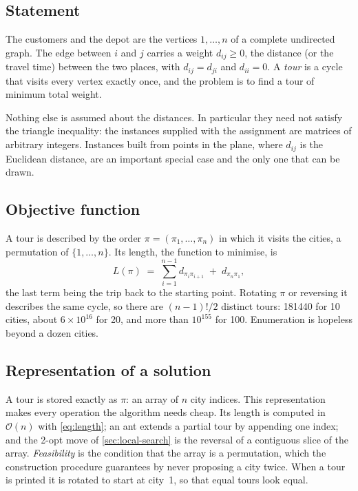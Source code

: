 \documentclass[11pt,a4paper]{article}
\newcommand{\bigO}{\mathcal{O}}
\begin{document}
\subsection{Statement}

The customers and the depot are the vertices $1,\dots,n$ of a complete undirected graph.
The edge between $i$ and $j$ carries a weight $d_{ij}\ge 0$, the distance (or the travel
time) between the two places, with $d_{ij}=d_{ji}$ and $d_{ii}=0$. A \emph{tour} is a cycle
that visits every vertex exactly once, and the problem is to find a tour of minimum total
weight.

Nothing else is assumed about the distances. In particular they need not satisfy the
triangle inequality: the instances supplied with the assignment are matrices of arbitrary
integers. Instances built from points in the plane, where $d_{ij}$ is the Euclidean
distance, are an important special case and the only one that can be drawn.

\subsection{Objective function}

A tour is described by the order $\pi=(\pi_1,\dots,\pi_n)$ in which it visits the cities,
a permutation of $\{1,\dots,n\}$. Its length, the function to minimise, is
\begin{equation}
    L(\pi) \;=\; \sum_{i=1}^{n-1} d_{\pi_i\pi_{i+1}} \;+\; d_{\pi_n\pi_1},
    \label{eq:length}
\end{equation}
the last term being the trip back to the starting point. Rotating $\pi$ or reversing it
describes the same cycle, so there are $(n-1)!/2$ distinct tours: \num{181440}
for 10 cities, about $6\times 10^{16}$ for 20, and more than $10^{155}$ for 100. Enumeration
is hopeless beyond a dozen cities.

\subsection{Representation of a solution}

A tour is stored exactly as $\pi$: an array of $n$ city indices. This representation makes
every operation the algorithm needs cheap. Its length is computed in $\bigO(n)$ with
\cref{eq:length}; an ant extends a partial tour by appending one index; and the 2-opt move
of \cref{sec:local-search} is the reversal of a contiguous slice of the array.
\emph{Feasibility} is the condition that the array is a permutation, which the construction
procedure guarantees by never proposing a city twice. When a tour is printed it is rotated
to start at city~1, so that equal tours look equal.
\end{document}
